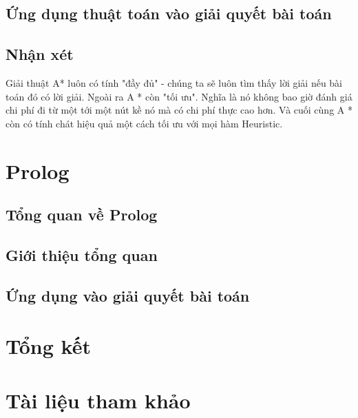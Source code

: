 \documentclass[12pt]{article}
\begin{document}
\subsection{Ứng dụng thuật toán vào giải quyết bài toán}
\subsection{Nhận xét}
Giải thuật A* luôn có tính "đầy đủ" - chúng ta sẽ luôn tìm thấy lời giải nếu bài toán đó có lời giải. Ngoài ra A * còn "tối ưu". Nghĩa là nó không bao giờ đánh giá chi phí đi từ một tới một nút kề nó mà có chi phí thực cao hơn. Và cuối cùng A * còn có tính chát hiệu quả một cách tối ưu với mọi hàm Heuristic.
\section{Prolog}
\subsection{Tổng quan về Prolog}
\subsection{Giới thiệu tổng quan}
\subsection{Ứng dụng vào giải quyết bài toán}
\section{Tổng kết}
\section{Tài liệu tham khảo}
\end{document}

